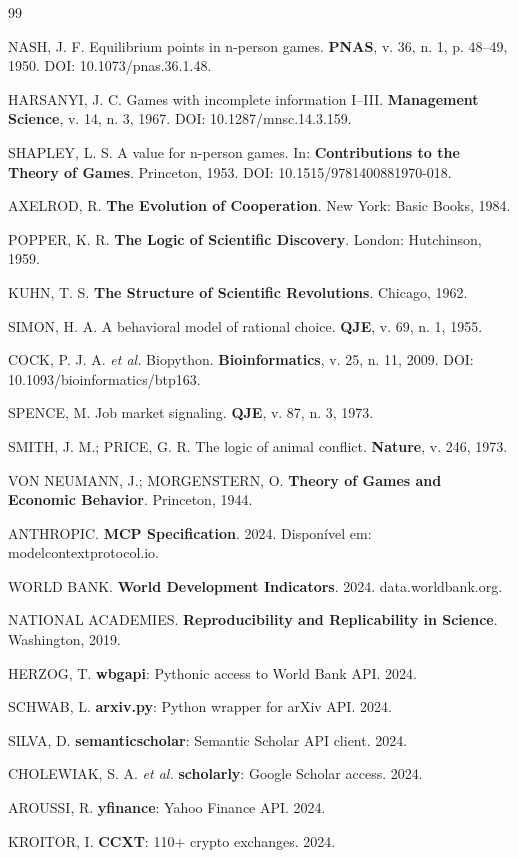 \documentclass[12pt,a4paper]{article}
\begin{document}
\begin{thebibliography}{99}

 NASH, J. F. Equilibrium points in n-person games. \textbf{PNAS}, v. 36, n. 1, p. 48--49, 1950. DOI: 10.1073/pnas.36.1.48.

 HARSANYI, J. C. Games with incomplete information I--III. \textbf{Management Science}, v. 14, n. 3, 1967. DOI: 10.1287/mnsc.14.3.159.

 SHAPLEY, L. S. A value for n-person games. In: \textbf{Contributions to the Theory of Games}. Princeton, 1953. DOI: 10.1515/9781400881970-018.

 AXELROD, R. \textbf{The Evolution of Cooperation}. New York: Basic Books, 1984.

 POPPER, K. R. \textbf{The Logic of Scientific Discovery}. London: Hutchinson, 1959.

 KUHN, T. S. \textbf{The Structure of Scientific Revolutions}. Chicago, 1962.

 SIMON, H. A. A behavioral model of rational choice. \textbf{QJE}, v. 69, n. 1, 1955.

 COCK, P. J. A. \textit{et al.} Biopython. \textbf{Bioinformatics}, v. 25, n. 11, 2009. DOI: 10.1093/bioinformatics/btp163.

 SPENCE, M. Job market signaling. \textbf{QJE}, v. 87, n. 3, 1973.

 SMITH, J. M.; PRICE, G. R. The logic of animal conflict. \textbf{Nature}, v. 246, 1973.

 VON NEUMANN, J.; MORGENSTERN, O. \textbf{Theory of Games and Economic Behavior}. Princeton, 1944.

 ANTHROPIC. \textbf{MCP Specification}. 2024. Disponível em: modelcontextprotocol.io.

 WORLD BANK. \textbf{World Development Indicators}. 2024. data.worldbank.org.

 NATIONAL ACADEMIES. \textbf{Reproducibility and Replicability in Science}. Washington, 2019.

 HERZOG, T. \textbf{wbgapi}: Pythonic access to World Bank API. 2024.

 SCHWAB, L. \textbf{arxiv.py}: Python wrapper for arXiv API. 2024.

 SILVA, D. \textbf{semanticscholar}: Semantic Scholar API client. 2024.

 CHOLEWIAK, S. A. \textit{et al.} \textbf{scholarly}: Google Scholar access. 2024.

 AROUSSI, R. \textbf{yfinance}: Yahoo Finance API. 2024.

 KROITOR, I. \textbf{CCXT}: 110+ crypto exchanges. 2024.

\end{thebibliography}
\end{document}
